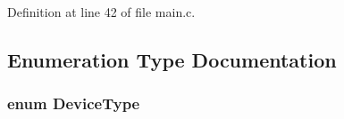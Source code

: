 Definition at line 42 of file main.\-c.



\subsection{Enumeration Type Documentation}
\hypertarget{group___open_pilot_b_l_gad258d4c51629346fceac4679b3209ad9}{
\subsubsection[{Device\-Type}]{\setlength{\rightskip}{0pt plus 5cm}enum {\bf Device\-Type}}}\label{group___open_pilot_b_l_gad258d4c51629346fceac4679b3209ad9}

